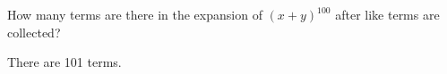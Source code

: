 \documentclass[../main.tex]{subfiles}
\begin{document}
How many terms are there in the expansion of $(x + y)^{100}$ after like terms are collected?

\solution
There are 101 terms.
\end{document}
